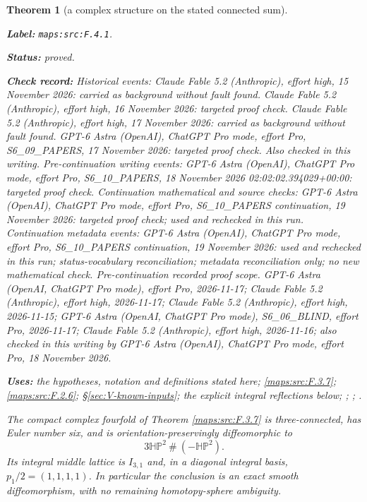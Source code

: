 \documentclass[11pt,a4paper]{article}
\newtheorem{theorem}{Theorem}[section]
\theoremstyle{definition}
\newcommand{\StatementRecord}[4]{\par\smallskip\begingroup\upshape\raggedright\noindent\textbf{Label:} \nolinkurl{#1}.\par\noindent\textbf{Status:} #2.\par\noindent\textbf{Check record:} #3.\par\noindent\textbf{Uses:} #4.\par\endgroup\smallskip}
\begin{document}
\begin{theorem}[a complex structure on the stated connected sum]\label{maps:src:F.4.1}
\StatementRecord{maps:src:F.4.1}{proved}{Historical events: Claude Fable 5.2 (Anthropic), effort high, 15 November 2026: carried as background without fault found. Claude Fable 5.2 (Anthropic), effort high, 16 November 2026: targeted proof check. Claude Fable 5.2 (Anthropic), effort high, 17 November 2026: carried as background without fault found. GPT-6 Astra (OpenAI), ChatGPT Pro mode, effort Pro, S6\_09\_PAPERS, 17 November 2026: targeted proof check. Also checked in this writing. Pre-continuation writing events: GPT-6 Astra (OpenAI), ChatGPT Pro mode, effort Pro, S6\_10\_PAPERS, 18 November 2026 02:02:02.394029+00:00: targeted proof check. Continuation mathematical and source checks: GPT-6 Astra (OpenAI), ChatGPT Pro mode, effort Pro, S6\_10\_PAPERS continuation, 19 November 2026: targeted proof check; used and rechecked in this run. Continuation metadata events: GPT-6 Astra (OpenAI), ChatGPT Pro mode, effort Pro, S6\_10\_PAPERS continuation, 19 November 2026: used and rechecked in this run; status-vocabulary reconciliation; metadata reconciliation only; no new mathematical check. \emph{Pre-continuation recorded proof scope.} GPT-6 Astra (OpenAI, ChatGPT Pro mode), effort Pro, 2026-11-17; Claude Fable 5.2 (Anthropic), effort high, 2026-11-17; Claude Fable 5.2 (Anthropic), effort high, 2026-11-15; GPT-6 Astra (OpenAI, ChatGPT Pro mode), S6\_06\_BLIND, effort Pro, 2026-11-17; Claude Fable 5.2 (Anthropic), effort high, 2026-11-16; also checked in this writing by GPT-6 Astra (OpenAI), ChatGPT Pro mode, effort Pro, 18 November 2026}{the hypotheses, notation and definitions stated here; \cref{maps:src:F.3.7}; \cref{maps:src:F.2.6}; \S\ref{sec:V-known-inputs}; the explicit integral reflections below; \cite[Corollary 1.4, p.~4]{ffMandal}; \cite[Definition 3.6 and Theorem 3.7(1), pp.~12--14]{IVVWallForm}; \cite[Theorem A, p.~178]{IVVKramerStolz}}


The compact complex fourfold of Theorem \ref{maps:src:F.3.7} is three-connected,
has Euler number six, and is orientation-preservingly diffeomorphic to
\[
 3\mathbb H\mathbb P^2\ \#\ (-\mathbb H\mathbb P^2).
 \tag{F.25}\label{maps:eq:F.25}
\]
Its integral middle lattice is $I_{3,1}$ and, in a diagonal integral
basis, $p_1/2=(1,1,1,1)$.  In particular the conclusion is an exact
smooth diffeomorphism, with no remaining homotopy-sphere ambiguity.

\end{theorem}
\end{document}
